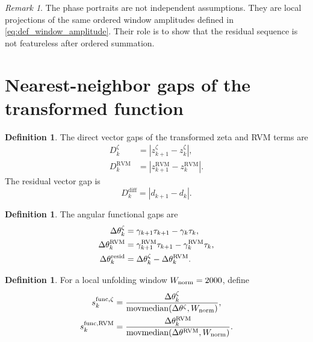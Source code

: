 \documentclass[11pt]{amsart}
\numberwithin{equation}{section}
\theoremstyle{plain}
\theoremstyle{definition}
\newtheorem{definition}[theorem]{Definition}
\theoremstyle{remark}
\newtheorem{remark}[theorem]{Remark}
\newcommand{\RVM}{\mathrm{RVM}}
\newcommand{\diff}{\mathrm{diff}}
\begin{document}
\begin{remark}
\label{rem:phase_portraits_role}
The phase portraits are not independent assumptions.  They are local projections of the same ordered window amplitudes defined in \eqref{eq:def_window_amplitude}.  Their role is to show that the residual sequence is not featureless after ordered summation.
\end{remark}

\section{Nearest-neighbor gaps of the transformed function}
\label{sec:nearest_neighbor_gaps}

\begin{definition}
\label{def:direct_vector_gaps}
The direct vector gaps of the transformed zeta and RVM terms are
\begin{align}
D_k^\zeta
&=
|z_{k+1}^\zeta-z_k^\zeta|,
\label{eq:def_zeta_vector_gap}
\\
D_k^{\RVM}
&=
|z_{k+1}^{\RVM}-z_k^{\RVM}|.
\label{eq:def_rvm_vector_gap}
\end{align}
The residual vector gap is
\begin{equation}
D_k^{\diff}
=
|d_{k+1}-d_k|.
\label{eq:def_diff_vector_gap}
\end{equation}
\end{definition}

\begin{definition}
\label{def:functional_angular_gaps}
The angular functional gaps are
\begin{align}
\Delta\theta_k^\zeta
&=
\gamma_{k+1}\tau_{k+1}-\gamma_k\tau_k,
\label{eq:def_zeta_functional_gap}
\\
\Delta\theta_k^{\RVM}
&=
\gamma_{k+1}^{\RVM}\tau_{k+1}-\gamma_k^{\RVM}\tau_k,
\label{eq:def_rvm_functional_gap}
\\
\Delta\theta_k^{\rm resid}
&=
\Delta\theta_k^\zeta-\Delta\theta_k^{\RVM}.
\label{eq:def_resid_functional_gap}
\end{align}
\end{definition}

\begin{definition}
\label{def:locally_unfolded_functional_gap}
For a local unfolding window \(W_{\rm norm}=2000\), define
\begin{align}
s_k^{\rm func,\zeta}
&=
\frac{\Delta\theta_k^\zeta}
{\operatorname{movmedian}(\Delta\theta^\zeta,W_{\rm norm})},
\label{eq:def_sfunc_zeta}
\\
s_k^{\rm func,\RVM}
&=
\frac{\Delta\theta_k^{\RVM}}
{\operatorname{movmedian}(\Delta\theta^{\RVM},W_{\rm norm})}.
\label{eq:def_sfunc_rvm}
\end{align}
\end{definition}
\end{document}
